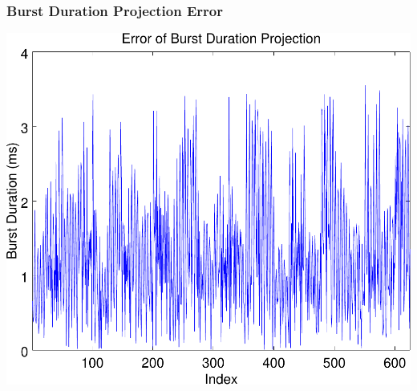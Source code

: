 \documentclass{beamer}
\theoremstyle{plain}
\theoremstyle{definition}
\begin{document}
\begin{frame}\frametitle{Burst Duration Projection Error}
  \begin{center}
    \includegraphics[scale=.5]{BurstDurationError.pdf}%
  \end{center}
\end{frame}
\end{document}
